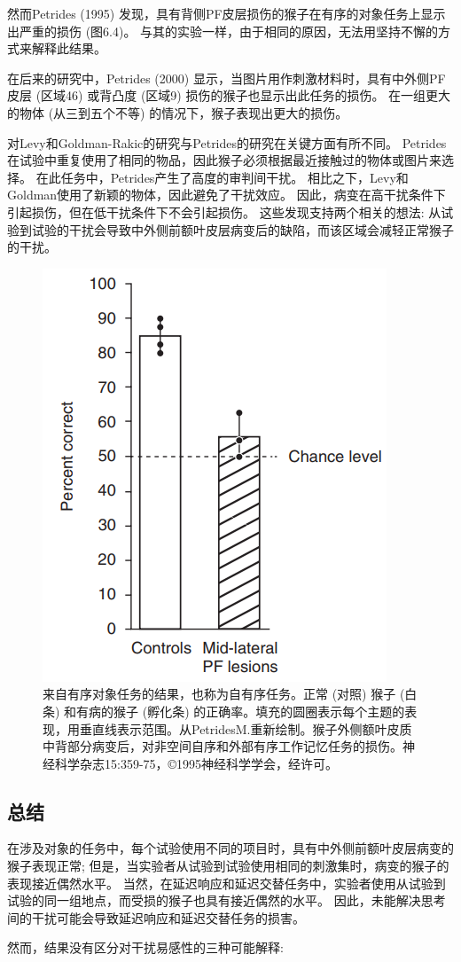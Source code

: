然而Petrides (1995) 发现，具有背侧PF皮层损伤的猴子在有序的对象任务上显示出严重的损伤 (图6.4)。
与其的实验一样，由于相同的原因，无法用坚持不懈的方式来解释此结果。


在后来的研究中，Petrides (2000) 显示，当图片用作刺激材料时，具有中外侧PF皮层 (区域46) 或背凸度 (区域9) 损伤的猴子也显示出此任务的损伤。
在一组更大的物体 (从三到五个不等) 的情况下，猴子表现出更大的损伤。


对Levy和Goldman-Rakic的研究与Petrides的研究在关键方面有所不同。
Petrides在试验中重复使用了相同的物品，因此猴子必须根据最近接触过的物体或图片来选择。
在此任务中，Petrides产生了高度的审判间干扰。
相比之下，Levy和Goldman使用了新颖的物体，因此避免了干扰效应。
因此，病变在高干扰条件下引起损伤，但在低干扰条件下不会引起损伤。
这些发现支持两个相关的想法: 从试验到试验的干扰会导致中外侧前额叶皮层病变后的缺陷，而该区域会减轻正常猴子的干扰。


\begin{figure}
	\centering
	\includegraphics[width=0.3\linewidth]{image_pfc/Fig_6_4}
	\caption{来自有序对象任务的结果，也称为自有序任务。正常 (对照) 猴子 (白条) 和有病的猴子 (孵化条) 的正确率。填充的圆圈表示每个主题的表现，用垂直线表示范围。从PetridesM.重新绘制。猴子外侧额叶皮质中背部分病变后，对非空间自序和外部有序工作记忆任务的损伤。神经科学杂志15:359-75，©1995神经科学学会，经许可。}
	\label{fig:fig}
\end{figure}


\subsection{总结}

在涉及对象的任务中，每个试验使用不同的项目时，具有中外侧前额叶皮层病变的猴子表现正常; 
但是，当实验者从试验到试验使用相同的刺激集时，病变的猴子的表现接近偶然水平。
当然，在延迟响应和延迟交替任务中，实验者使用从试验到试验的同一组地点，而受损的猴子也具有接近偶然的水平。
因此，未能解决思考间的干扰可能会导致延迟响应和延迟交替任务的损害。


然而，结果没有区分对干扰易感性的三种可能解释:
\par


